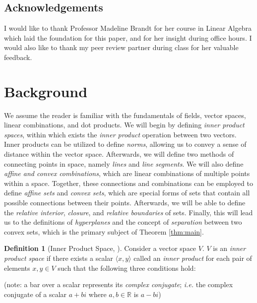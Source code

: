 \documentclass[11pt,reqno]{amsart}
\newcommand{\R}{\mathbb{R}}
\theoremstyle{plain}
\theoremstyle{definition}
\newtheorem{definition}[theorem]{Definition}
\begin{document}
{\subsection*{Acknowledgements} I would like to thank Professor Madeline Brandt for her course in Linear Algebra which laid the foundation for this paper, and for her insight during office hours. I would also like to thank my peer review partner during class for her valuable feedback.
}

\section{Background}
\label{sec:background}
{
\setlength{\parskip}{8pt}
We assume the reader is familiar with the fundamentals of fields, vector spaces, linear combinations, and dot products. We will begin by defining \emph{inner product spaces}, within which exists the \emph{inner product} operation between two vectors. Inner products can be utilized to define \emph{norms}, allowing us to convey a sense of distance within the vector space. Afterwards, we will define two methods of connecting points in space, namely \emph{lines} and \emph{line segments}. We will also define \emph{affine and convex combinations}, which are linear combinations of multiple points within a space. Together, these connections and combinations can be employed to define \emph{affine sets} and \emph{convex sets}, which are special forms of sets that contain all possible connections between their points. Afterwards, we will be able to define the \emph{relative interior}, \emph{closure}, and \emph{relative boundaries} of sets. Finally, this will lead us to the definitions of \emph{hyperplanes} and the concept of \emph{separation} between two convex sets, which is the primary subject of Theorem \ref{thm:main}.
\smallskip
\begin{definition}[{Inner Product Space, \cite{nimark}}]
    Consider a vector space $V$. $V$ is an \emph{inner product space} if there exists a scalar $\langle x,y\rangle$ called an \emph{inner product} for each pair of elements $x,y\in V$ such that the following three conditions hold:

    (note: a bar over a scalar represents its \emph{complex conjugate}; \emph{i.e.} the complex conjugate of a scalar $a + bi$ where $a,b\in\R$ is $a - bi$)


\end{definition}}
\end{document}
